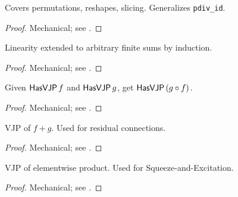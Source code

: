 \begin{theorem}
  \label{ax:pdiv_reindex}
  \leanok
  Covers permutations, reshapes, slicing. Generalizes \texttt{pdiv\_id}.
\end{theorem}

\begin{proof}
\leanok
Mechanical; see .
\end{proof}

\begin{theorem}
  \label{thm:pdiv_finset_sum}
  \leanok
  Linearity extended to arbitrary finite sums by induction.
\end{theorem}

\begin{proof}
\leanok
Mechanical; see .
\end{proof}

\begin{theorem}
  \label{thm:vjp_comp}
  \leanok
  Given \(\mathsf{HasVJP}\, f\) and \(\mathsf{HasVJP}\, g\), get \(\mathsf{HasVJP}\, (g \circ f)\).
\end{theorem}

\begin{proof}
\leanok
Mechanical; see .
\end{proof}

\begin{theorem}
  \label{thm:biPath_has_vjp}
  \leanok
  VJP of \(f + g\). Used for residual connections.
\end{theorem}

\begin{proof}
\leanok
Mechanical; see .
\end{proof}

\begin{theorem}
  \label{thm:elemwiseProduct_has_vjp}
  \leanok
  VJP of elementwise product. Used for Squeeze-and-Excitation.
\end{theorem}

\begin{proof}
\leanok
Mechanical; see .
\end{proof}

